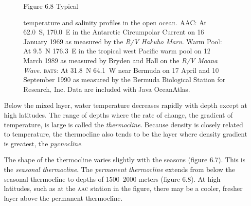 \begin{figure}[t!]
\footnotesize
Figure 6.8 Typical \rule{0mm}{4ex}temperature and salinity profiles in
the open ocean. AAC: At 62.0\degrees\ S, 170.0\degrees\ E in the
Antarctic Circumpolar Current on
16 January 1969 as measured by the \textit{R/V Hakuho Maru}. Warm
Pool: At 9.5\degrees\ N 176.3\degrees\ E in the tropical west Pacific
warm pool on 12 March 1989 as measured by Bryden and Hall on the
\textit{R/V Moana Wave}.  \textsc{bats}: At 31.8\degrees\ N
64.1\degrees\ W near Bermuda on 17 April and 10 September 1990 as
measured by the Bermuda Biological Station for Research, Inc.  Data
are included with Java OceanAtlas.
\label{fig:TandSProfile}
\vspace{-5ex}
\end{figure}

Below the mixed layer, water
temperature decreases rapidly with depth except at high latitudes. The
range of depths where the rate of change, the gradient of temperature,
is large is called the
\textit{thermocline}. Because density is
closely related to temperature, the thermocline also tends to be the
layer where density gradient is greatest, the
\textit{pycnocline}.

The shape of the thermocline varies slightly with the seasons (figure 6.7).
This is the \textit{seasonal thermocline}.
 The \textit{permanent thermocline}
extends from below the seasonal
thermocline to depths of 1500--2000 meters (figure 6.8). At high
latitudes, such as at the \textsc{aac} station in the figure, there
may be a cooler, fresher layer above the permanent thermocline.


